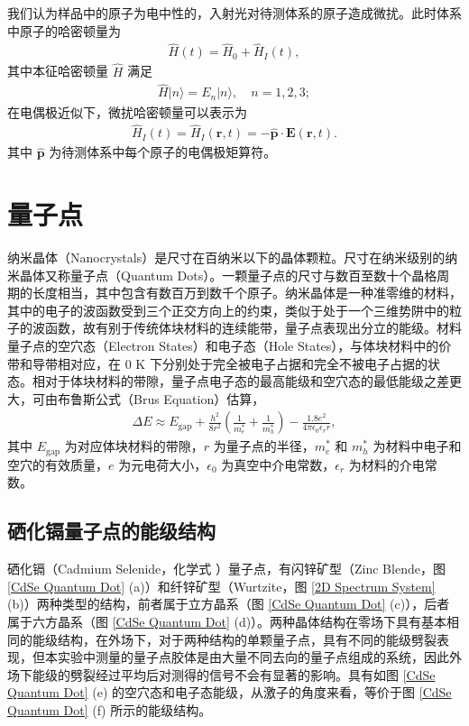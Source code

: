 \documentclass{thesis}
\begin{document}
我们认为样品中的原子为电中性的，入射光对待测体系的原子造成微扰。此时体系中原子的哈密顿量为
\begin{align}
    \hat{H}(t)=\hat{H}_0+\hat{H}_I(t),
\end{align}
其中本征哈密顿量 $\hat{H}$ 满足
\begin{align}
    \hat{H}\lvert n\rangle=E_n\lvert n\rangle,\quad n=1,2,3;
\end{align}
在电偶极近似下，微扰哈密顿量可以表示为
\begin{align}
    \hat{H}_I(t)=\hat{H}_I(\bm{r},t)=-\hat{\bm{p}}\cdot\bm{E}(\bm{r},t).
\end{align}
其中 $\hat{\bm{p}}$ 为待测体系中每个原子的电偶极矩算符。

\section{量子点}
纳米晶体（Nanocrystals）是尺寸在百纳米以下的晶体颗粒。尺寸在纳米级别的纳米晶体又称量子点（Quantum Dots）。一颗量子点的尺寸与数百至数十个晶格周期的长度相当，其中包含有数百万到数千个原子。纳米晶体是一种准零维的材料，其中的电子的波函数受到三个正交方向上的约束，类似于处于一个三维势阱中的粒子的波函数，故有别于传统体块材料的连续能带，量子点表现出分立的能级。材料量子点的空穴态（Electron States）和电子态（Hole States），与体块材料中的价带和导带相对应，在 $0$ K 下分别处于完全被电子占据和完全不被电子占据的状态。相对于体块材料的带隙，量子点电子态的最高能级和空穴态的最低能级之差更大，可由布鲁斯公式（Brus Equation）\cite{brus1986electronic}\cite{kippeny2002semiconductor}估算，
\begin{align}
    \label{Brus Equ}
    \Delta E\approx E_{\text{gap}}+\frac{h^2}{8r^2}\left(\frac{1}{m_e^*}+\frac{1}{m_h^*}\right)-\frac{1.8e^2}{4\pi\epsilon_0\epsilon_rr},
\end{align}
其中 $E_{\text{gap}}$ 为对应体块材料的带隙，$r$ 为量子点的半径，$m_e^*$ 和 $m_h^*$ 为材料中电子和空穴的有效质量，$e$ 为元电荷大小，$\epsilon_0$ 为真空中介电常数，$\epsilon_r$ 为材料的介电常数。

\subsection{硒化镉量子点的能级结构}
硒化镉（Cadmium Selenide，化学式 ）量子点，有闪锌矿型（Zinc Blende，图 \ref{CdSe Quantum Dot} (a)）和纤锌矿型（Wurtzite，图 \ref{2D Spectrum System} (b)）两种类型的结构，前者属于立方晶系（图 \ref{CdSe Quantum Dot} (c)），后者属于六方晶系（图 \ref{CdSe Quantum Dot} (d)）。两种晶体结构在零场下具有基本相同的能级结构，在外场下，对于两种结构的单颗量子点，具有不同的能级劈裂表现，但本实验中测量的量子点胶体是由大量不同去向的量子点组成的系统，因此外场下能级的劈裂经过平均后对测得的信号不会有显著的影响。具有如图 \ref{CdSe Quantum Dot} (e) 的空穴态和电子态能级，从激子的角度来看，等价于图 \ref{CdSe Quantum Dot} (f) 所示的能级结构。
\end{document}
